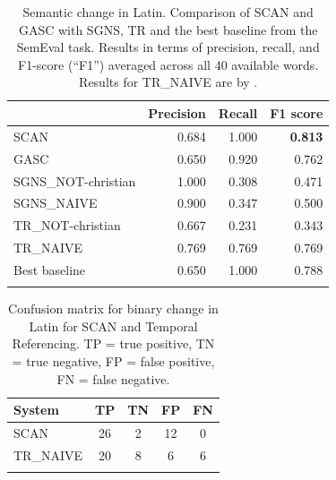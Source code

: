 \documentclass[output=paper]{langscibook}
\begin{document}
\begin{table}
\begin{tabular}{lrrr}
\lsptoprule
\multicolumn{1}{l}{Latin (BCE/CE)} & \multicolumn{1}{c}{Precision} & \multicolumn{1}{c}{Recall} & \multicolumn{1}{c}{F1 score}\\ \midrule
SCAN                  & 0.684 & 1.000 & \textbf{0.813}   \\
GASC                  & 0.650 & 0.920 & 0.762  \\
SGNS\_NOT-christian   & 1.000 & 0.308 & 0.471  \\
SGNS\_NAIVE           & 0.900 & 0.347 & 0.500  \\
TR\_NOT-christian     & 0.667 & 0.231 & 0.343  \\
TR\_NAIVE             & 0.769 & 0.769 & 0.769  \\
Best baseline         & 0.650 & 1.000 & 0.788  \\ \lspbottomrule
\end{tabular}
\caption{Semantic change in Latin. Comparison of SCAN and GASC with SGNS, TR and the best baseline from the SemEval task. Results in terms of precision, recall, and F1-score (``F1'') averaged across all 40 available words. Results for TR\_NAIVE are by \citet{zhou-etal-2020-temporalteller}.\label{table:binary_change}}
\end{table}


\begin{table}
\begin{tabular}{lcccc}
\lsptoprule
System      & TP & TN & FP & FN \\ \midrule
SCAN        & 26 & 2  & 12 & 0  \\ 
TR\_NAIVE   & 20 & 8  & 6  & 6  \\ \lspbottomrule
\end{tabular}
\caption{Confusion matrix for binary change in Latin for SCAN and Temporal Referencing. TP = true positive, TN = true negative, FP = false positive, FN = false negative.\label{tab:confusion-matrix}}
\end{table}
\end{document}

